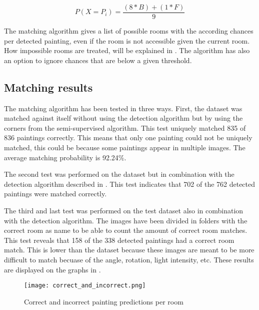 \begin{equation}
    \label{eq:histogram-score}
    P(X = P_{i}) = \frac{(8 * B) + (1 * F)}{9}
\end{equation}

The matching algorithm gives a list of possible rooms with the according chances per detected painting, even if the room is not accessible given the current room. How impossible rooms are treated, will be explained in . The algorithm has also an option to ignore chances that are below a given threshold.

\subsection{Matching results}
The matching algorithm has been tested in three ways. First, the dataset was matched against itself without using the detection algorithm but by using the corners from the semi-supervised algorithm. This test uniquely matched 835 of 836 paintings correctly. This means that only one painting could not be uniquely matched, this could be because some paintings appear in multiple images. The average matching probability is 92.24\%.

The second test was performed on the dataset but in combination with the detection algorithm described in . This test indicates that 702 of the 762 detected paintings were matched correctly.

The third and last test was performed on the test dataset also in combination with the detection algorithm. The images have been divided in folders with the correct room as name to be able to count the amount of correct room matches. This test reveals that 158 of the 338 detected paintings had a correct room match. This is lower than the dataset because these images are meant to be more difficult to match becuase of the angle, rotation, light intensity, etc. These results are displayed on the graphs in .

\begin{figure}
    \centering
    \texttt{[image: correct\_and\_incorrect.png]}

    \caption{Correct and incorrect painting predictions per room}
    \label{fig:correct-incorrect-paintings}
\end{figure}
